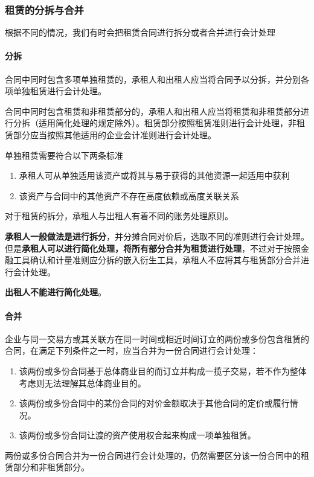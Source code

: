 \documentclass[UTF8,12pt]{ctexart}
\numberwithin{equation}{section} %
\numberwithin{figure}{section}
\numberwithin{table}{section}
\begin{document}
	\subsubsection{租赁的分拆与合并}
	根据不同的情况，我们有时会把租赁合同进行拆分或者合并进行会计处理
	\paragraph{分拆}
	合同中同时包含多项单独租赁的，承租人和出租人应当将合同予以分拆，并分别各项单独租赁进行会计处理。
	
	合同中同时包含租赁和非租赁部分的，承租人和出租人应当将租赁和非租赁部分进行分拆（适用简化处理的规定除外）。租赁部分按照租赁准则进行会计处理，非租赁部分应当按照其他适用的企业会计准则进行会计处理。
	
	单独租赁需要符合以下两条标准
	\begin{enumerate}
		\item 承租人可从单独适用该资产或将其与易于获得的其他资源一起适用中获利
		
		\item 该资产与合同中的其他资产不存在高度依赖或高度关联关系
	\end{enumerate}
	
	对于租赁的拆分，承租人与出租人有着不同的账务处理原则。
	
	\textbf{承租人一般做法是进行拆分}，并分摊合同对价后，选取不同的准则进行会计处理。但是\textbf{承租人可以进行简化处理，将所有部分合并为租赁进行处理}，不过对于按照金融工具确认和计量准则应分拆的嵌入衍生工具，承租人不应将其与租赁部分合并进行会计处理。
	
	\textbf{出租人不能进行简化处理}。
	
	
	\paragraph{合并}
	
	企业与同一交易方或其关联方在同一时间或相近时间订立的两份或多份包含租赁的合同，在满足下列条件之一时，应当合并为一份合同进行会计处理：
	\begin{enumerate}
		\item 该两份或多份合同基于总体商业目的而订立并构成一揽子交易，若不作为整体考虑则无法理解其总体商业目的。
		\item 该两份或多份合同中的某份合同的对价金额取决于其他合同的定价或履行情况。
		\item 该两份或多份合同让渡的资产使用权合起来构成一项单独租赁。
	\end{enumerate}	
	两份或多份合同合并为一份合同进行会计处理的，仍然需要区分该一份合同中的租赁部分和非租赁部分。
	
\end{document}
